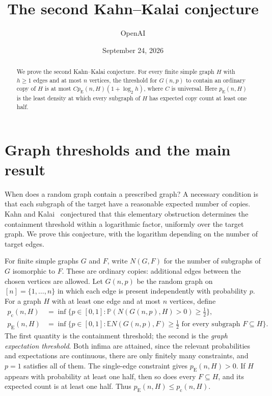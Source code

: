 \documentclass[11pt]{article}
\title{The second Kahn--Kalai conjecture}
\author{OpenAI}
\date{September 24, 2026}
\numberwithin{equation}{section}
\newcommand{\PP}{\mathbb P}
\newcommand{\EE}{\mathbb E}
\newcommand{\pc}{p_{\mathrm c}}
\newcommand{\pE}{p_{\mathrm E}}
\begin{document}
\maketitle
\begin{abstract}
We prove the second Kahn--Kalai conjecture. For every finite simple graph
$H$ with $h\ge1$ edges and at most $n$ vertices, the threshold for
$G(n,p)$ to contain an ordinary copy of $H$ is at most
$C p_{\mathrm E}(n,H)(1+\log_2 h)$, where $C$ is universal.
Here $p_{\mathrm E}(n,H)$ is the least density at which every subgraph
of $H$ has expected copy count at least one half.
\end{abstract}

\section{Graph thresholds and the main result}\label{sec:introduction}

When does a random graph contain a prescribed graph? A necessary
condition is that each subgraph of the target have a reasonable expected
number of copies. Kahn and Kalai~\cite{KK07} conjectured
that this elementary obstruction determines the containment threshold
within a logarithmic factor, uniformly over the target graph. We prove
this conjecture, with the logarithm depending on the number of target
edges.

For finite simple graphs $G$ and $F$, write $N(G,F)$ for the number of
subgraphs of $G$ isomorphic to $F$. These are ordinary copies: additional
edges between the chosen vertices are allowed. Let $G(n,p)$ be the
random graph on $[n]=\{1,\ldots,n\}$ in which each edge is present
independently with probability $p$. For a graph $H$ with at least one
edge and at most $n$ vertices, define
\begin{align*}
 \pc(n,H)
 &=\inf\{p\in[0,1]:\PP(N(G(n,p),H)>0)\ge\tfrac12\},\\
 \pE(n,H)
 &=\inf\{p\in[0,1]:\EE N(G(n,p),F)\ge\tfrac12
                 \text{ for every subgraph }F\subseteq H\}.
\end{align*}
The first quantity is the containment threshold; the second is the
\emph{graph expectation threshold}. Both infima are attained, since the
relevant probabilities and expectations are continuous, there are only
finitely many constraints, and $p=1$ satisfies all of them. The
single-edge constraint gives $\pE(n,H)>0$. If $H$ appears with
probability at least one half, then so does every $F\subseteq H$, and
its expected count is at least one half. Thus $\pE(n,H)\le\pc(n,H)$.
\end{document}
